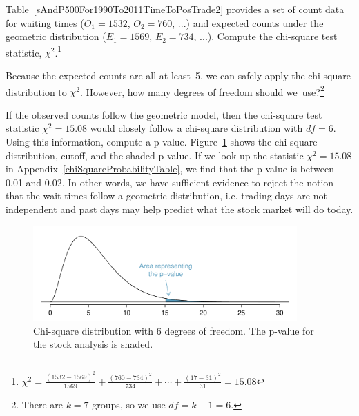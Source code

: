 \begin{exercise}
Table~\ref{sAndP500For1990To2011TimeToPosTrade2} provides a set of count data for waiting times ($O_1=1532$, $O_2=760$, ...) and expected counts under the geometric distribution ($E_1=1569$, $E_2=734$, ...). Compute the chi-square test statistic, $\chi^2$.\footnote{$\chi^2=\frac{(1532-1569)^2}{1569} + \frac{(760-734)^2}{734} + \cdots + \frac{(17-31)^2}{31} = 15.08$}
\end{exercise}

\begin{exercise}
Because the expected counts are all at least~5, we can safely apply the chi-square distribution to $\chi^2$. However, how many degrees of freedom should we~use?\footnote{There are $k=7$ groups, so we use $df=k-1=6$.}
\end{exercise}

\begin{example}{If the observed counts follow the geometric model, then the chi-square test statistic $\chi^2=15.08$ would closely follow a chi-square distribution with $df=6$. Using this information, compute a p-value.} \label{RejectGeomModelForSP500StockDataFor1990To2011}
Figure~\ref{geomFitPValueForSP500For1990To2011} shows the chi-square distribution, cutoff, and the shaded p-value. If we look up the statistic $\chi^2=15.08$ in Appendix~\ref{chiSquareProbabilityTable}, we find that the p-value is between 0.01 and 0.02. In other words, we have sufficient evidence to reject the notion that the wait times follow a geometric distribution, i.e. trading days are not independent and past days may help predict what the stock market will do today.
\end{example}

\begin{figure}[h]
\centering
\includegraphics[width=0.9\textwidth]{ch_inference_for_props/figures/geomFitPValueForSP500For1990To2011/geomFitPValueForSP500For1990To2011}
\caption{Chi-square distribution with 6 degrees of freedom. The p-value for the stock analysis is shaded.}
\label{geomFitPValueForSP500For1990To2011}
\end{figure}

